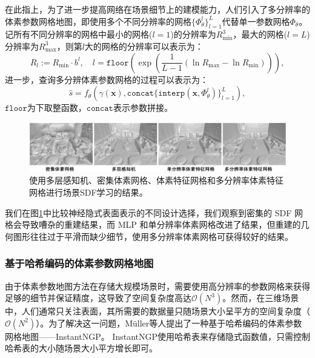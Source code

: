 在此指上，为了进一步提高网络在场景细节上的建模能力，人们引入了多分辨率的体素参数网格地图\cite{yu_monosdf_2022}，即使用多个不同分辨率的网格$\{\Phi^l_\theta\}^L_{l=1}$代替单一参数网格$\Phi_\theta$。记所有不同分辨率的网格中最小的网格($l=1$)的分辨率为$R_{\min}^3$，最大的网格($l=L$)分辨率为$R_{\max}^3$，则第$l$大的网格的分辨率可以表示为：
\begin{equation}
    R_l:=R_{\min}\cdot b^l, \quad l=\mathtt{floor}(\exp(\frac{1}{L - 1}(\ln R_{\max} - \ln R_{\min}))),
\end{equation}
进一步，查询多分辨体素参数网格的过程可以表示为：
\begin{equation}
    \hat{s} = f_\theta(\gamma(\mathbf{x}), \mathtt{concat}\{\mathtt{interp}(\mathbf{x}, \Phi_\theta^l)\}_{l=1}^L),
\end{equation}
$\mathtt{floor}$为下取整函数，$\mathtt{concat}$表示参数拼接。

\begin{figure}[ht]
    \centering
    \includegraphics[width=\textwidth]{undergraduate-thesis/images/related-work/monosdf-result.pdf}
    \caption{使用多层感知机、密集体素网格、体素特征网格和多分辨率体素特征网格进行场景SDF学习的结果\cite{yu_monosdf_2022}。}
    \label{fig:related-work monosdf result}
\end{figure}

我们在图\ref{fig:related-work monosdf result}中比较神经隐式表面表示的不同设计选择，我们观察到密集的 SDF 网格会导致嘈杂的重建结果，而 MLP 和单分辨率体素网格改进了结果，但重建的几何图形往往过于平滑而缺少细节，使用多分辨率体素网格可获得较好的结果。

\subsubsection{基于哈希编码的体素参数网格地图}
由于体素参数地图方法在存储大规模场景时，需要使用高分辨率的参数网格来获得足够的细节并保证精度，这导致了空间复杂度高达$\mathcal{O}(N^3)$。然而，在三维场景中，人们通常只关注表面，其所需要的数据量只随场景大小呈平方的空间复杂度（$\mathcal{O}(N^2)$）。为了解决这一问题，M\"uller等人提出了一种基于哈希编码的体素参数网格地图——InstantNGP\cite{muller_instant_2022}。 InstantNGP使用哈希表来存储隐式函数值，只需控制哈希表的大小随场景大小平方增长即可。

